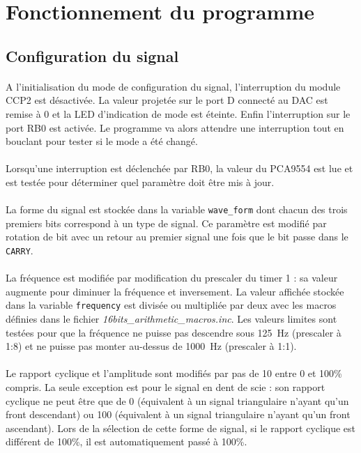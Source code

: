 \documentclass{article}
\begin{document}
    \newpage
    \section{Fonctionnement du programme}
    \subsection{Configuration du signal}
    \paragraph{}
    A l'initialisation du mode de configuration du signal, l'interruption du module CCP2 est désactivée. La valeur projetée sur le port D connecté au DAC est remise à 0 et la LED d'indication de mode est éteinte. Enfin l'interruption sur le port RB0 est activée. Le programme va alors attendre une interruption tout en bouclant pour tester si le mode a été changé.

    \paragraph{}
    Lorsqu'une interruption est déclenchée par RB0, la valeur du PCA9554 est lue et est testée pour déterminer quel paramètre doit être mis à jour.

    \paragraph{}
    La forme du signal est stockée dans la variable \texttt{wave\_form} dont chacun des trois premiers bits correspond à un type de signal. Ce paramètre est modifié par rotation de bit avec un retour au premier signal une fois que le bit passe dans le \texttt{CARRY}.

    \paragraph{}
    La fréquence est modifiée par modification du prescaler du timer 1 : sa valeur augmente pour diminuer la fréquence et inversement. La valeur affichée stockée dans la variable \texttt{frequency} est divisée ou multipliée par deux avec les macros définies dans le fichier \emph{16bits\_arithmetic\_macros.inc}. Les valeurs limites sont testées pour que la fréquence ne puisse pas descendre sous  \SI{125}{\hertz} (prescaler à 1:8) et ne puisse pas monter au-dessus de \SI{1000}{\hertz} (prescaler à 1:1).

    \paragraph{}
    Le rapport cyclique et l'amplitude sont modifiés par pas de 10 entre 0 et 100\% compris. La seule exception est pour le signal en dent de scie : son rapport cyclique ne peut être que de 0 (équivalent à un signal triangulaire n'ayant qu'un front descendant) ou 100 (équivalent à un signal triangulaire n'ayant qu'un front ascendant). Lors de la sélection de cette forme de signal, si le rapport cyclique est différent de 100\%, il est automatiquement passé à 100\%.
\end{document}
